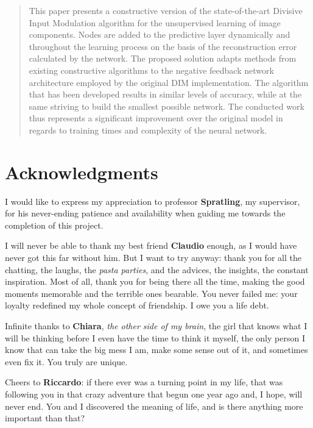 \documentclass[11pt,a4paper]{report}
\begin{document}
	
	
	
	\begin{abstract}
		This paper presents a constructive version of the state-of-the-art Divisive Input Modulation algorithm for the unsupervised learning of image components. Nodes are added to the predictive layer dynamically and throughout the learning process on the basis of the reconstruction error calculated by the network. The proposed solution adapts methods from existing constructive algorithms to the negative feedback network architecture employed by the original DIM implementation. The algorithm that has been developed results in similar levels of accuracy, while at the same striving to build the smallest possible network. The conducted work thus represents a significant improvement over the original model in regards to training times and complexity of the neural network.
	\end{abstract}
	
	
	\chapter*{Acknowledgments}
		I would like to express my appreciation to professor \textbf{Spratling}, my supervisor, for his never-ending patience and availability when guiding me towards the completion of this project.
		
		I will never be able to thank my best friend \textbf{Claudio} enough, as I would have never got this far without him. But I want to try anyway: thank you for all the chatting, the laughs, the \emph{pasta parties}, and the advices, the insights, the constant inspiration. Most of all, thank you for being there all the time, making the good moments memorable and the terrible ones bearable. You never failed me: your loyalty redefined my whole concept of friendship. I owe you a life debt.
		
		Infinite thanks to \textbf{Chiara}, \emph{the other side of my brain}, the girl that knows what I will be thinking before I even have the time to think it myself, the only person I know that can take the big mess I am, make some sense out of it, and sometimes even fix it. You truly are unique.
		
		Cheers to \textbf{Riccardo}: if there ever was a turning point in my life, that was following you in that crazy adventure that begun one year ago and, I hope, will never end. You and I discovered the meaning of life, and is there anything more important than that?
		
\end{document}
